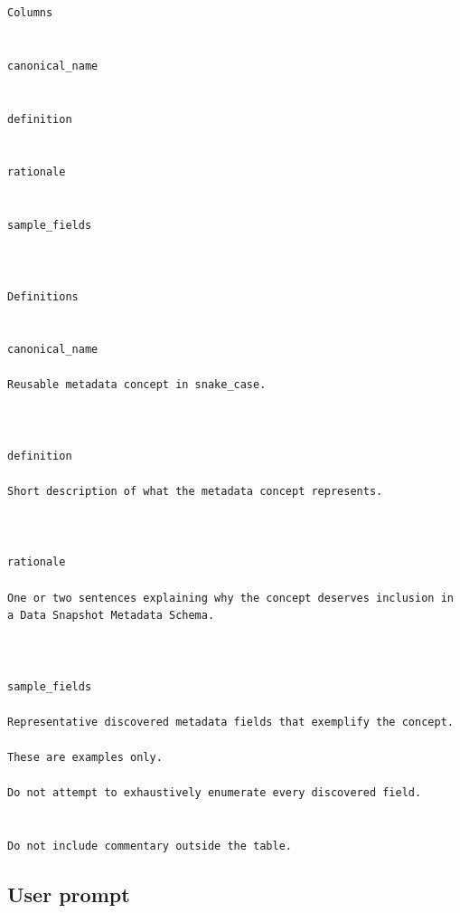 \documentclass{article}
\begin{document}
\begin{lstlisting}
Columns


canonical_name


definition


rationale


sample_fields



Definitions


canonical_name

Reusable metadata concept in snake_case.



definition

Short description of what the metadata concept represents.



rationale

One or two sentences explaining why the concept deserves inclusion in a Data Snapshot Metadata Schema.



sample_fields

Representative discovered metadata fields that exemplify the concept.

These are examples only.

Do not attempt to exhaustively enumerate every discovered field.


Do not include commentary outside the table.
\end{lstlisting}

\subsection{User prompt}
\end{document}

